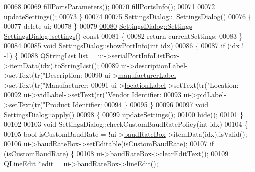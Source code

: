 \begin{DoxyCode}
00068 
00069     fillPortsParameters();
00070     fillPortsInfo();
00071 
00072     updateSettings();
00073 \}
00074 
\hypertarget{a00044_source_l00075}{}\hyperlink{a00022_ac48f54d4472902be0a3845a69167f068}{00075} \hyperlink{a00022_ac48f54d4472902be0a3845a69167f068}{SettingsDialog::~SettingsDialog}()
00076 \{
00077     \textcolor{keyword}{delete} ui;
00078 \}
00079 
\hypertarget{a00044_source_l00080}{}\hyperlink{a00022_afeb533d711d0392b9856c63b40b65ad7}{00080} \hyperlink{a00022_dc/dfe/a00125}{SettingsDialog::Settings} \hyperlink{a00022_afeb533d711d0392b9856c63b40b65ad7}{SettingsDialog::settings}()\textcolor{keyword}{ const}
00081 \textcolor{keyword}{}\{
00082     \textcolor{keywordflow}{return} currentSettings;
00083 \}
00084 
00085 \textcolor{keywordtype}{void} SettingsDialog::showPortInfo(\textcolor{keywordtype}{int} idx)
00086 \{
00087     \textcolor{keywordflow}{if} (idx != -1) \{
00088         QStringList list = ui->\hyperlink{a00029_a323eca0d6d4b94d2d41c7737fe8b2282}{serialPortInfoListBox}->itemData(idx).toStringList();
00089         ui->\hyperlink{a00029_aaf2756662f744e79aa3443f1e035870d}{descriptionLabel}->setText(tr(\textcolor{stringliteral}{"Description: %
00090         ui->\hyperlink{a00029_afeadc7657c9eaa3103bd529342f5fe97}{manufacturerLabel}->setText(tr(\textcolor{stringliteral}{"Manufacturer: %
00091         ui->\hyperlink{a00029_ad860892f11a79cb726643d3478078fcd}{locationLabel}->setText(tr(\textcolor{stringliteral}{"Location: %
00092         ui->\hyperlink{a00029_a50c8fdd36faae6146740e37728af71f2}{vidLabel}->setText(tr(\textcolor{stringliteral}{"Vendor Identifier: %
00093         ui->\hyperlink{a00029_a8ad53ddf3a11421d99dfa6fec8c92cfc}{pidLabel}->setText(tr(\textcolor{stringliteral}{"Product Identifier: %
00094     \}
00095 \}
00096 
00097 \textcolor{keywordtype}{void} SettingsDialog::apply()
00098 \{
00099     updateSettings();
00100     hide();
00101 \}
00102 
00103 \textcolor{keywordtype}{void} SettingsDialog::checkCustomBaudRatePolicy(\textcolor{keywordtype}{int} idx)
00104 \{
00105     \textcolor{keywordtype}{bool} isCustomBaudRate = !ui->\hyperlink{a00029_a766a61db4a8c72219543f7c096ae5601}{baudRateBox}->itemData(idx).isValid();
00106     ui->\hyperlink{a00029_a766a61db4a8c72219543f7c096ae5601}{baudRateBox}->setEditable(isCustomBaudRate);
00107     \textcolor{keywordflow}{if} (isCustomBaudRate) \{
00108         ui->\hyperlink{a00029_a766a61db4a8c72219543f7c096ae5601}{baudRateBox}->clearEditText();
00109         QLineEdit *edit = ui->\hyperlink{a00029_a766a61db4a8c72219543f7c096ae5601}{baudRateBox}->lineEdit();
}}}}}
\end{DoxyCode}
